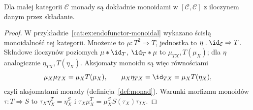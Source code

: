 \begin{stwierdzenie}\label{cat:prop:monads-as-monoids}
Dla małej kategorii $\mathcal C$ monady są dokładnie monoidami w $[\mathcal C,\mathcal C]$ z iloczynem danym przez składanie.
\end{stwierdzenie}
\begin{proof}
W przykładzie~\ref{cat:ex:endofunctor-monoidal} wykazano ścisłą monoidalność tej kategorii. Mnożenie to $\mu:T^2\Rightarrow T$, jednostka to $\eta:\id_{\mathcal C}\Rightarrow T$. Składowe iloczynów poziomych $\mu\ast\id_T$, $\id_T\ast\mu$ to $\mu_{TX},T(\mu_X)$; dla $\eta$ analogicznie $\eta_{TX},T(\eta_X)$. Aksjomaty monoidu są więc równościami
\[
\mu_X\mu_{TX}=\mu_XT(\mu_X),\qquad
\mu_X\eta_{TX}=\id_{TX}=\mu_XT(\eta_X),
\]
czyli aksjomatami monady (definicja~\ref{def:monad}). Warunki morfizmu monoidów $\tau:T\Rightarrow S$ to
$\tau_X\eta_X^T=\eta_X^S$ i $\tau_X\mu_X^T=\mu_X^S S(\tau_X)\tau_{TX}$.
\end{proof}


